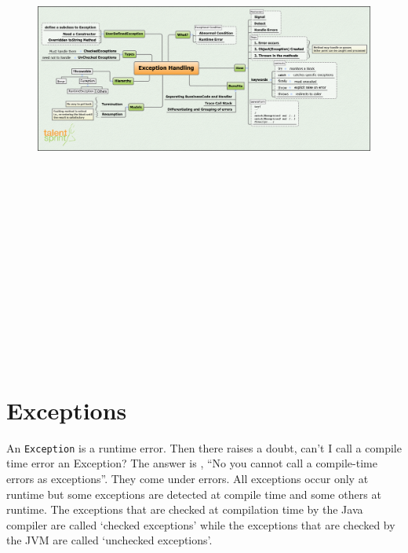\documentclass[11pt,a4paper]{article}
\begin{document}
\begin{figure}[H]
 \begin{center}
   \includegraphics[angle=90,height=19cm, width=13cm]{ExceptionHandling.png}
 \end{center}
 \end{figure}
\section*{Exceptions}
An \texttt{Exception} is a runtime error. Then there raises a doubt, can't I call a compile time error an Exception? The answer is , ``No you cannot call a compile-time errors as exceptions''. They come under errors. All exceptions occur only at runtime but some exceptions are detected at compile time and some others at runtime. The exceptions that are checked at compilation time by the Java compiler are called `checked exceptions' while the exceptions that are checked by the JVM are called `unchecked exceptions'.
\end{document}

